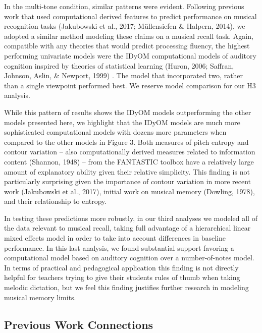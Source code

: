 \documentclass[english,man]{apa6}
\begin{document}
In the multi-tone condition, similar patterns were evident. Following previous work that used computational derived features to predict performance on musical recognition tasks (Jakubowski et al., 2017; Müllensiefen \& Halpern, 2014), we adopted a similar method modeling these claims on a musical recall task.
Again, compatible with any theories that would predict processing fluency, the highest performing univariate models were the IDyOM computational models of auditory cognition inspired by theories of statistical learning (Huron, 2006; Saffran, Johnson, Aslin, \& Newport, 1999) .
The model that incorporated two, rather than a single viewpoint performed best. We reserve model comparison for our H3 analysis.

While this pattern of results shows the IDyOM models outperforming the other models presented here, we highlight that the IDyOM models are much more sophisticated computational models with dozens more parameters when compared to the other models in Figure 3.
Both measures of pitch entropy and contour variation -- also computationally derived measures related to information content (Shannon, 1948) -- from the FANTASTIC toolbox have a relatively large amount of explanatory ability given their relative simplicity. This finding is not particularly surprising given the importance of contour variation in more recent work (Jakubowski et al., 2017), initial work on musical memory (Dowling, 1978), and their relationship to entropy.

In testing these predictions more robustly, in our third analyses we modeled all of the data relevant to musical recall, taking full advantage of a hierarchical linear mixed effects model in order to take into account differences in baseline performance.
In this last analysis, we found substantial support favoring a computational model based on auditory cognition over a number-of-notes model.\\
In terms of practical and pedagogical application this finding is not directly helpful for teachers trying to give their students rules of thumb when taking melodic dictation, but we feel this finding justifies further research in modeling musical memory limits.

\hypertarget{previous-work-connections}{%
\subsection{Previous Work Connections}\label{previous-work-connections}}
\end{document}
